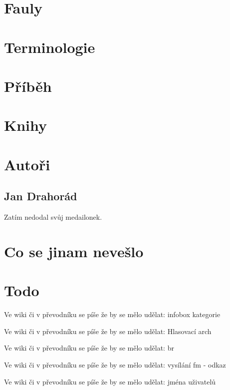 \documentclass[a4paper,8pt]{book}
\newcommand{\todo}[1]{
Ve wiki či v převodníku se píše že by se mělo udělat: #1 
}
\begin{document}
\chapter{Fauly}\label{fauly}


\chapter{Terminologie}\label{terminologie}



\chapter{Příběh}\label{pribeh}


\chapter{Knihy}\label{knihy}



\chapter{Autoři}\label{autori}
\section{Jan Drahorád}
Zatím nedodal svůj medailonek.



\chapter{Co se jinam nevešlo}\label{co se jinam nevešlo}

\chapter{Todo}
\todo{infobox kategorie}
\todo{Hlasovací arch}
\todo{br}
\todo{vysílání fm - odkaz}
\todo{jména uživatelů}
\setcounter{tocdepth}{1}
\tableofcontents
\end{document}
